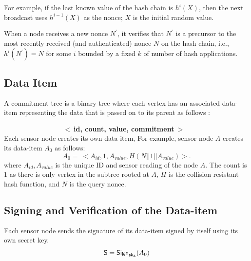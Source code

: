 \documentclass[%
  slidesonly,%
  semlayer%
  ]{seminar}                                  %
\newcommand{\sk}{\sf{sk}}
\begin{document}
\begin{slide}
      For example, if the last known value of the hash chain is $h^i(X)$, then the next broadcast uses $h^{i-1}(X)$ as the nonce; $X$ is the initial random value.
      
      When a node receives a new nonce $N^{'}$, it verifies that $N^{'}$ is a precursor to the most recently received (and authenticated) nonce $N$ on the hash chain, i.e., $h^{i}(N^{'}) = N$ for some $i$ bounded by a fixed $k$ of number of hash applications.  
      
      \clearpage

    
    \subsection*{Data Item}
        A commitment tree is a binary tree where each vertex has an associated data-item representing the data that is passed on to its parent as follows :

        $\hspace{100pt}$ \textbf{$<\ $id, count, value, commitment$\ >$}\\
  
      Each sensor node creates its own data-item, For example, sensor node $A$ creates its data-item $A_{0}$ as follows:
      \begin{equation*}
        \label{eq:data-item}
        A_{0} =\ <A_{id}, 1, A_{value}, H(N||1||A_{value})>.
      \end{equation*}
      where $A_{id}, A_{value}$ is the unique ID and sensor reading of the node $A$. 
      The count is $1$ as there is only vertex in the subtree rooted at $A$, $H$ is the collision resistant hash function, and $N$ is the query nonce.
    \clearpage

    \subsection*{Signing and Verification of the Data-item}
      Each sensor node sends the signature of its data-item signed by itself using its own secret key. 
        \begin{equation*}
          \textsf{S} = \textsf{Sign}_{\sk_{A}}(A_{0})
        \end{equation*}


\end{slide}
\end{document}
